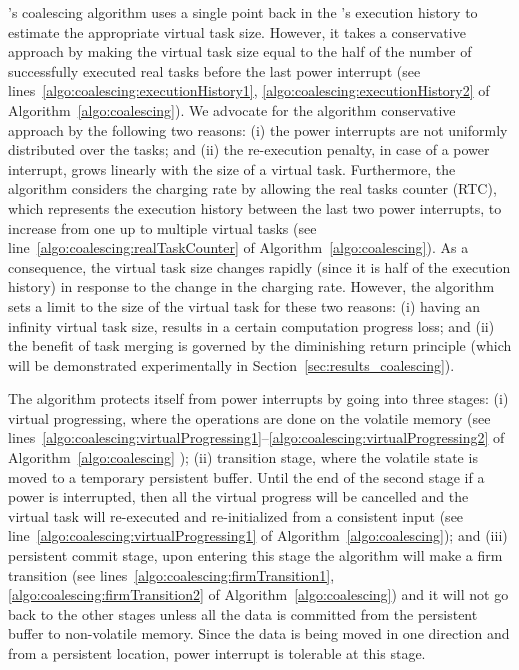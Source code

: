 \sys's coalescing algorithm uses a single point back in the \sys's execution
history to estimate the appropriate virtual task size. However, it takes a
conservative approach by making the virtual task size equal to the half of the
number of successfully executed real tasks before the last power interrupt (see
lines~\ref{algo:coalescing:executionHistory1},
\ref{algo:coalescing:executionHistory2} of Algorithm~\ref{algo:coalescing}). We
advocate for the algorithm conservative approach by the following two reasons:
(i) the power interrupts are not uniformly distributed over the tasks; and (ii)
the re-execution penalty, in case of a power interrupt, grows linearly with the
size of a virtual task. Furthermore, the algorithm considers the charging rate
by allowing the real tasks counter (RTC), which represents the execution
history between the last two power interrupts, to increase from one up to
multiple virtual tasks (see line~\ref{algo:coalescing:realTaskCounter} of
Algorithm~\ref{algo:coalescing}). As a consequence, the virtual task size
changes rapidly (since it is half of the execution history) in response to the
change in the charging rate. However, the algorithm sets a limit to the size of
the virtual task for these two reasons: (i) having an infinity virtual task
size, results in a certain computation progress loss; and (ii) the benefit of
task merging is governed by the diminishing return principle (which will be
demonstrated experimentally in Section~\ref{sec:results_coalescing}).

The algorithm protects itself from power interrupts by going into three stages: (i) virtual progressing, where the operations are done on the volatile memory (see lines~\ref{algo:coalescing:virtualProgressing1}--\ref{algo:coalescing:virtualProgressing2} of Algorithm~\ref{algo:coalescing} ); (ii) transition stage, where the volatile state is moved to a temporary persistent buffer. Until the end of the second stage if a power is interrupted, then all the virtual progress will be cancelled and the virtual task will re-executed and re-initialized from a consistent input (see line~\ref{algo:coalescing:virtualProgressing1} of Algorithm~\ref{algo:coalescing}); and (iii) persistent commit stage, upon entering this stage the algorithm will make a firm transition (see lines~\ref{algo:coalescing:firmTransition1}, \ref{algo:coalescing:firmTransition2} of Algorithm~\ref{algo:coalescing}) and it will not go back to the other stages unless all the data is committed from the persistent buffer to non-volatile memory. Since the data is being moved in one direction and from a persistent location, power interrupt is tolerable at this stage. 

